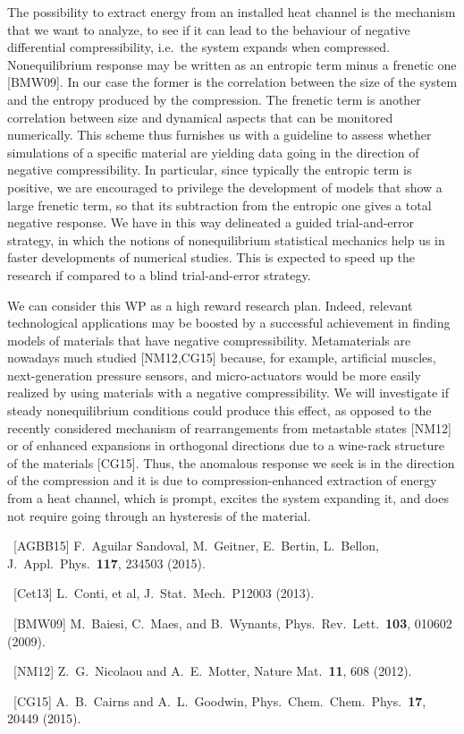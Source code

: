 \begin{workpackage}[id=WPcompress,wphases=0-48,
  short=Nonequilibrium compressibility, %
  title=Nonequilibrium compressibility, %
  lead=UNIPD,
  UNIPDRM=48]
\begin{wpdescription}
The possibility to extract energy from an installed heat channel is the mechanism that we want to
analyze, to see if it can lead to the behaviour of negative differential compressibility,
i.e.~the system expands when compressed. 
Nonequilibrium response may be written as an entropic term minus a frenetic one [BMW09].
In our case the former is the correlation between the size of the system and the entropy produced by the compression.
The frenetic term is another correlation between size and dynamical aspects that can be monitored numerically.
This scheme thus furnishes us with a guideline to assess whether simulations of a specific material are yielding data 
going in the direction of negative compressibility. In particular, since typically the entropic term is positive, we
are encouraged to privilege the development of models that show a large frenetic term, so that its subtraction from
the entropic one gives a total negative response.
We have in this way delineated a guided trial-and-error strategy, in which the notions of 
nonequilibrium statistical mechanics help us in faster developments of numerical studies. This is expected to
speed up the research if compared to a blind trial-and-error strategy.


We can consider this WP as a high reward research plan. Indeed, relevant technological applications
may be boosted by a successful achievement in finding models of materials that have negative compressibility.
Metamaterials are nowadays much studied [NM12,CG15] because, for example, artificial muscles, 
next-generation pressure sensors, and micro-actuators would be
more easily realized by using materials with a negative compressibility. We will investigate
if steady nonequilibrium conditions could produce this effect, as opposed to the recently considered 
mechanism of rearrangements from metastable states [NM12] or of enhanced expansions in orthogonal directions
due to a wine-rack structure of the materials [CG15]. Thus, the anomalous response we seek is in the direction 
of the compression and it is due to compression-enhanced extraction of energy from a heat channel,
which is prompt, excites the system expanding it, 
and does not require going through an hysteresis of the material. 

\begin{compactitem}
\item ~[AGBB15] F.~Aguilar Sandoval, M.~Geitner, E.~Bertin, L.~Bellon, J.~Appl.~Phys.~{\bf 117}, 234503 (2015).
\item ~[Cet13] L.~Conti, et al, J.~Stat.~Mech.~P12003 (2013).
\item ~[BMW09]  M.~Baiesi, C.~Maes,  and B.~Wynants, Phys.~Rev.~Lett.~{\bf 103}, 010602 (2009).
\item ~[NM12] Z.~G.~Nicolaou and A.~E.~Motter, Nature Mat.~{\bf 11}, 608 (2012).
\item ~[CG15] A.~B.~Cairns and A.~L.~Goodwin, Phys.~Chem.~Chem.~Phys.~{\bf 17}, 20449 (2015).
\end{compactitem}


\end{wpdescription}
\end{workpackage}
